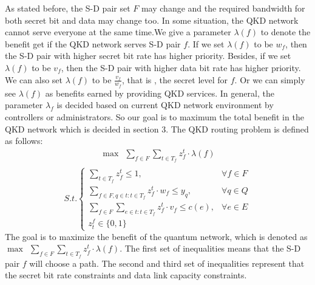 As stated before, the S-D pair set $F$ may change and the required bandwidth for both secret bit and data may change too. In some situation, the QKD network cannot serve everyone at the same time.We give a parameter $\lambda(f)$ to denote the benefit get if the QKD network serves S-D pair $f$. If we set $\lambda(f)$ to be $w_f$, then the S-D pair with higher secret bit rate has higher priority. Besides, if we set $\lambda(f)$ to be $v_f$, then the S-D pair with higher data bit rate has higher priority. We can also set $\lambda(f)$ to be $\frac{v_f}{w_f}$, that is , the secret level for $f$. Or we can simply see $\lambda(f)$ as benefits earned by providing QKD services. In general, the parameter $\lambda_f$ is decided based on current QKD network environment by controllers or administrators. So our goal is to maximum the total benefit in the QKD network which is decided in section 3. The QKD routing problem is defined as follows:
	\begin{equation*}
    \begin{aligned}
    \max \ \ \sum_{f \in F}\sum_{t \in T_f}{z_f^t \cdot \lambda(f)} \\
    \end{aligned}
	\end{equation*}
	\begin{equation}\label{eq:profit}
	S.t.\begin{cases}
     \sum_{t \in T_f}{z_f^t} \le 1, & \forall f \in F \\
     \sum_{f \in F,q \in t:t \in T_f}{z_f^t \cdot w_f} \le  y_q, & \forall q \in Q \\
     \sum_{f \in F}\sum_{e \in t:t \in T_f}{z_f^t \cdot v_f} \le c(e), & \forall e \in E \\
     z^f_t \in \{0,1\}

	\end{cases}
	\end{equation}
The goal is to maximize the benefit of the quantum network, which is denoted as $\max \ \ \sum_{f \in F}\sum_{t \in T_f}{z_f^t \cdot \lambda(f)}$. The first set of inequalities means that the S-D pair $f$ will choose a path. The second and third set of inequalities represent that the secret bit rate constraints and data link capacity constraints.


